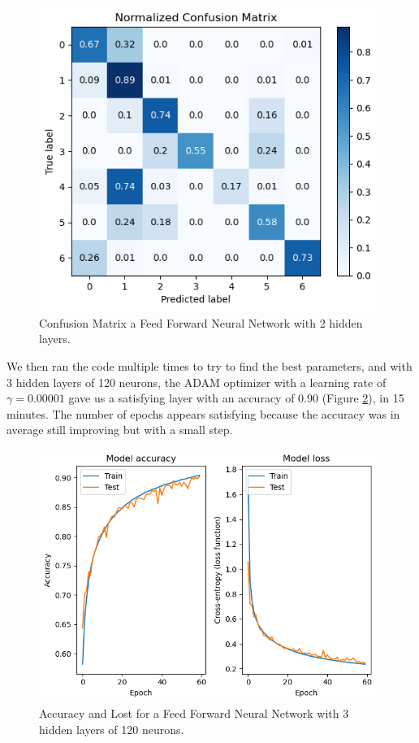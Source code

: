 \documentclass[letterpaper,12pt]{article}
\begin{document}
\begin{figure}[H]
    \centering
    \includegraphics[width=11cm]{cm_FFNN.png}
    \caption{\centering Confusion Matrix a Feed Forward Neural Network with 2 hidden layers.}
    \label{FFNN_cm}
\end{figure}

We then ran the code multiple times to try to find the best parameters, and with 3 hidden layers of 120 neurons, the ADAM optimizer with a learning rate of $\gamma = 0.00001$ gave us a satisfying layer with an accuracy of 0.90 (Figure \ref{FFNN2_Acculost}), in 15 minutes. The number of epochs appears satisfying because the accuracy was in average still improving but with a small step.
\begin{figure}[H]
    \centering
    \includegraphics[width=11cm]{LossAccuracy9.png}
    \caption{\centering Accuracy and Lost for a Feed Forward Neural Network with 3 hidden layers of 120 neurons.}
    \label{FFNN2_Acculost}
\end{figure}
\end{document}
